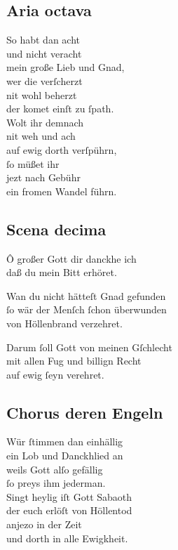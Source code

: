 \documentclass{ees}
\newenvironment{lyrics}[1]{%
  \subsection{#1}\nopagebreak%
  \begin{lyricslist}%
  \let\voice\item%
}{%
  \end{lyricslist}%
}
\begin{document}
\begin{lyrics}{Aria octava}
  \voice[Schöpffer]
  So habt dan acht\\
  und nicht veracht\\
  mein große Lieb und Gnad,\\
  wer die verſcherzt\\
  nit wohl beherzt\\
  der komet einſt zu ſpath.\\[1ex]
  Wolt ihr demnach\\
  nit weh und ach\\
  auf ewig dorth verſpührn,\\
  ſo müßet ihr\\
  jezt nach Gebühr\\
  ein fromen Wandel führn.
\end{lyrics}

\begin{lyrics}{Scena decima}
  \voice[Barmh.]
  Ô großer Gott dir danckhe ich\\
  daß du mein Bitt erhöret.

  \voice[Gerecht.]
  Wan du nicht hätteſt Gnad gefunden\\
  ſo wär der Menſch ſchon überwunden\\
  von Höllenbrand verzehret.

  \voice[Adam]
  Darum ſoll Gott von meinen Gſchlecht\\
  mit allen Fug und billign Recht\\
  auf ewig ſeyn verehret.
\end{lyrics}

\begin{lyrics}{Chorus deren Engeln}
  \voice[Chorus]
  Wür ſtimmen dan einhällig\\
  ein Lob und Danckhlied an\\
  weils Gott alſo gefällig\\
  ſo preys ihm jederman.\\[1ex]
  Singt heylig iſt Gott Sabaoth\\
  der euch erlöſt von Höllentod\\
  anjezo in der Zeit\\
  und dorth in alle Ewigkheit.
\end{lyrics}
\end{document}
